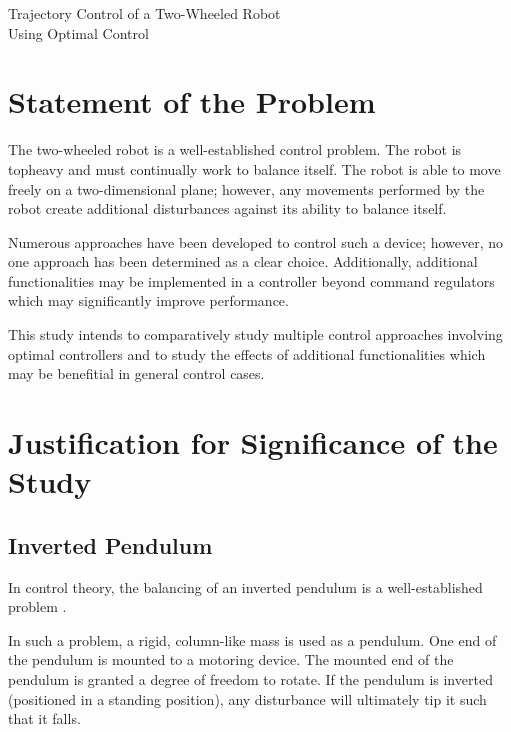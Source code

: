 \documentclass[crop=false,float=true,class=scrartcl]{standalone}
\begin{document}
\doublespacing

\begin{center}
\LARGE
Trajectory Control of a Two-Wheeled Robot \\ 
Using Optimal Control
\end{center}

\tableofcontents




\clearpage




\section{Statement of the Problem}

The two-wheeled robot is a well-established control problem.  
The robot is topheavy and must continually work to balance itself.
The robot is able to move freely on a two-dimensional plane; however,
any movements performed by the robot create additional disturbances
against its ability to balance itself.

Numerous approaches have been developed to control such a device;
however, no one approach has been determined as a clear choice.
Additionally, additional functionalities may be implemented 
in a controller beyond command regulators
which may significantly improve performance.

This study intends to comparatively study multiple control approaches involving optimal controllers
and to study the effects of additional functionalities which may be benefitial in general control cases.




\clearpage




\section{Justification for Significance of the Study}
\label{SEC:justification}




\subsection{Inverted Pendulum}
\label{SEC:justification:inverted pendulum}

In control theory, the balancing of an inverted pendulum is a well-established problem \cite{REF:Textbook:1995-Vaccaro}.

In such a problem, a rigid, column-like mass is used as a pendulum.
One end of the pendulum is mounted to a motoring device.
The mounted end of the pendulum is granted a degree of freedom to rotate.
If the pendulum is inverted {\fns(positioned in a standing position)},
any disturbance will ultimately tip it such that it falls.
\end{document}
